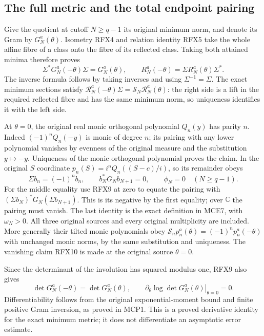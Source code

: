 \documentclass[11pt,a4paper]{article}
\begin{document}
\subsection{The full metric and the total endpoint pairing}
Give the quotient at cutoff $N\ge q-1$ its original minimum norm,
and denote its Gram by $G_N^a(\theta)$. Isometry RFX4 and relation
identity RFX5 take the whole affine fibre of a class onto the fibre
of its reflected class. Taking both attained minima therefore proves
\[
 \Sigma^*G_N^a(-\theta)\Sigma=G_N^a(\theta),\qquad
 R_N^a(-\theta)=\Sigma R_N^a(\theta)\Sigma^*.
 \tag{RFX9}
\]
The inverse formula follows by taking inverses and using
$\Sigma^{-1}=\Sigma$. The exact minimum sections satisfy
$\mathcal R_N^a(-\theta)\Sigma=\mathscr S_N\mathcal R_N^a(\theta)$:
the right side is a lift in the required reflected fibre and has the
same minimum norm, so uniqueness identifies it with the left side.

At $\theta=0$, the original real monic orthogonal polynomial
$Q_n(y)$ has parity $n$. Indeed $(-1)^nQ_n(-y)$ is monic of degree
$n$; its pairing with any lower polynomial vanishes by evenness of
the original measure and the substitution $y\mapsto-y$. Uniqueness
of the monic orthogonal polynomial proves the claim. In the original
$S$ coordinate $p_n(S)=i^nQ_n((S-c)/i)$, so its remainder obeys
\[
 \Sigma b_n=(-1)^n b_n,
 \qquad b_N^*G_Nb_{N+1}=0,
 \qquad \phi_N=0\quad(N\ge q-1).
 \tag{RFX10}
\]
For the middle equality use RFX9 at zero to equate the pairing with
$(\Sigma b_N)^*G_N(\Sigma b_{N+1})$. This is its negative by the
first equality; over $\mathbb C$ the pairing must vanish. The last
identity is the exact definition in MCE7, with $\omega_N>0$.
All three original sources and every original multiplicity are
included. More generally their tilted monic polynomials obey
$\mathscr S_np_n^a(\theta)=(-1)^np_n^a(-\theta)$ with unchanged
monic norms, by the same substitution and uniqueness. The vanishing
claim RFX10 is made at the original source $\theta=0$.

Since the determinant of the involution has squared modulus one,
RFX9 also gives
\[
 \det G_N^a(-\theta)=\det G_N^a(\theta),\qquad
 \left.\partial_\theta\log\det G_N^a(\theta)\right|_{\theta=0}=0.
 \tag{RFX11}
\]
Differentiability follows from the original exponential-moment
bound and finite positive Gram inversion, as proved in MCP1.
This is a proved derivative identity for the exact minimum metric;
it does not differentiate an asymptotic error estimate.
\end{document}
